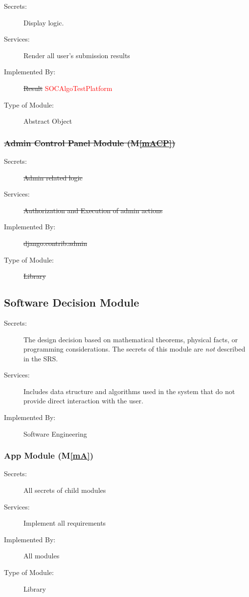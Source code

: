 \documentclass[12pt, titlepage]{article}
\newcommand{\mref}[1]{M\ref{#1}}
\begin{document}
\begin{description}
\item[Secrets:] Display logic.
\item[Services:] Render all user's submission results
\item[Implemented By:] \sout{Result}  \textcolor{red}{SOCAlgoTestPlatform}
\item[Type of Module:] Abstract Object
\end{description}

\subsubsection{\sout{Admin Control Panel Module (\mref{mACP})}}

\begin{description}
\item[Secrets:] \sout{Admin related logic}
\item[Services:] \sout{Authorization and Execution of admin actions}
\item[Implemented By:] \sout{django.contrib.admin}
\item[Type of Module:] \sout{Library}
\end{description}

\subsection{Software Decision Module}

\begin{description}
\item[Secrets:] The design decision based on mathematical theorems, physical
  facts, or programming considerations. The secrets of this module are
  \emph{not} described in the SRS.
\item[Services:] Includes data structure and algorithms used in the system that
  do not provide direct interaction with the user. 
\item[Implemented By:] Software Engineering
\end{description}

\subsubsection{App Module (\mref{mA})}

\begin{description}
\item[Secrets:] All secrets of child modules
\item[Services:] Implement all requirements
\item[Implemented By:] All modules
\item[Type of Module:] Library
\end{description}
\end{document}
